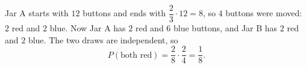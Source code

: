 Jar A starts with $12$ buttons and ends with $\dfrac{2}{3}\cdot12=8$, so $4$ buttons were moved: $2$ red and $2$ blue. Now Jar A has $2$ red and $6$ blue buttons, and Jar B has $2$ red and $2$ blue. The two draws are independent, so
\[
P(\text{both red})=\dfrac{2}{8}\cdot\dfrac{2}{4}=\boxed{\dfrac{1}{8}}.
\]
